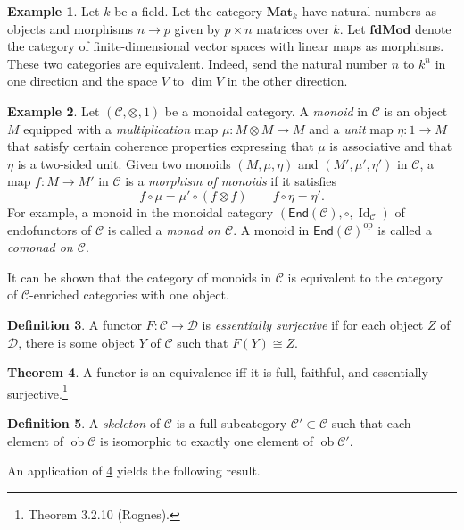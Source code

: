 \documentclass[10pt,letterpaper,cm]{nupset}
\theoremstyle{definition}
\newtheorem{definition}{Definition}[section]
\newtheorem{exmp}[definition]{Example}
\theoremstyle{theorem}
\newtheorem{theorem}[definition]{Theorem}
\theoremstyle{remark}
\newcommand{\1}{\mathbf{1}}
\renewcommand{\c}{\mathscr{C}}
\renewcommand{\d}{\mathscr{D}}
\newcommand{\0}{\vec 0}
\DeclareMathOperator{\id}{Id}
\DeclareMathOperator{\op}{op}
\DeclareMathOperator{\ob}{ob}
\begin{document}
\begin{exmp}
Let $k$ be a field. Let the category $\mathbf{Mat}_k$  have natural numbers as objects and morphisms $n \to p$ given by $p \times n$ matrices over $k$. Let $\mathbf{fdMod}$ denote the category of finite-dimensional vector spaces with linear maps as morphisms. These two categories are equivalent. Indeed, send the natural number $n$ to $k^n$ in one direction and the space $V$ to $\dim V$ in the other direction.    
\end{exmp}

\begin{exmp}
Let $\left(\c, \otimes, 1\right)$ be a monoidal category. A \textit{monoid} in $\c$ is an object $M$ equipped with a \textit{multiplication} map $\mu : M \otimes M \to M$ and a \textit{unit} map $\eta : 1 \to M$ that satisfy certain coherence properties expressing that $\mu$ is associative and that $\eta$ is a two-sided unit. Given two monoids $\left(M, \mu, \eta\right)$ and $\left(M', \mu', \eta'\right)$ in $\c$, a map $f : M \to M'$ in $\c$ is a \textit{morphism of monoids} if it satisfies 
\[
f \circ \mu = \mu' \circ \left(f \otimes f\right) \quad \quad f \circ \eta = \eta'.
\]
For example, a monoid  in the monoidal category $\left(\mathsf{End}(\c), \circ, \id_{\c}\right)$ of endofunctors of $\c$ is called a \textit{monad on $\c$}. A monoid in $\mathsf{End}(\c)^{\op}$ is called a \textit{comonad on $\c$}.

It can be shown that the category of monoids in $\c$ is equivalent to the category of $\c$-enriched categories with one object.
\end{exmp}

\begin{definition}
A functor $F : \c \to \d$ is \textit{essentially surjective} if for each object $Z$ of  $\d$, there is some object $Y$ of $\c$ such that $F(Y) \cong Z$.
\end{definition}

\begin{theorem}\label{equiv}
A functor is an equivalence iff it is full, faithful, and essentially surjective.\footnote{Theorem 3.2.10 (Rognes).}
\end{theorem}


\begin{definition}
A \textit{skeleton} of $\c$ is a full subcategory $\c' \subset \c$ such that each element of $\ob \c$ is isomorphic to exactly one element of $\ob \c'$.
\end{definition}

An application of \cref{equiv} yields the following result.
\end{document}
